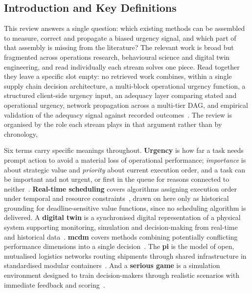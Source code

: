 \subsection{Introduction and Key Definitions}
\label{sec:lit_intro}

This review answers a single question: which existing methods can be assembled to measure,
correct and propagate a biased urgency signal, and which part of that assembly is missing from
the literature? The relevant work is broad but fragmented across operations research,
behavioural science and digital twin engineering, and read individually each stream solves one
piece. Read together they leave a specific slot empty: no retrieved work combines, within a
single supply chain decision architecture, a multi-block operational urgency function, a
structured client-side urgency input, an adequacy layer comparing stated and operational
urgency, network propagation across a multi-tier DAG, and empirical validation of the adequacy
signal against recorded
outcomes~\autocite{sawik2013integrated,sawik2014joint,sawik2016integrated,cohen2021assigning,hosseini2020bayesian}.
The review is organised by the role each stream plays in that argument rather than by
chronology, 

Six terms carry specific meanings throughout. \textbf{Urgency} is how far a task needs prompt
action to avoid a material loss of operational performance; \emph{importance} is about
strategic value and \emph{priority} about current execution order, and a task can be important
and not urgent, or first in the queue for reasons connected to
neither~\autocite{cheng2025survey,zhu2018mere}. \textbf{Real-time scheduling} covers algorithms
assigning execution order under temporal and resource
constraints~\autocite{pinedo2012scheduling}, drawn on here only as historical grounding for
deadline-sensitive value functions, since no scheduling algorithm is delivered. A
\textbf{digital twin} is a synchronised digital representation of a physical system supporting
monitoring, simulation and decision-making from real-time and historical
data~\autocite{ivanov2020digital}. \textbf{\Gls{mcdm}} covers
methods combining potentially conflicting performance dimensions into a single
decision~\autocite{saaty1980analytic,brans1986promethee}. The \textbf{\Gls{pi}} is the model of open, mutualised logistics networks routing shipments through
shared infrastructure in standardised modular containers~\autocite{montreuil2011toward}. And a
\textbf{serious game} is a simulation environment designed to train decision-makers through
realistic scenarios with immediate feedback and
scoring~\autocite{sterman1989modeling,prensky2001digital}.

